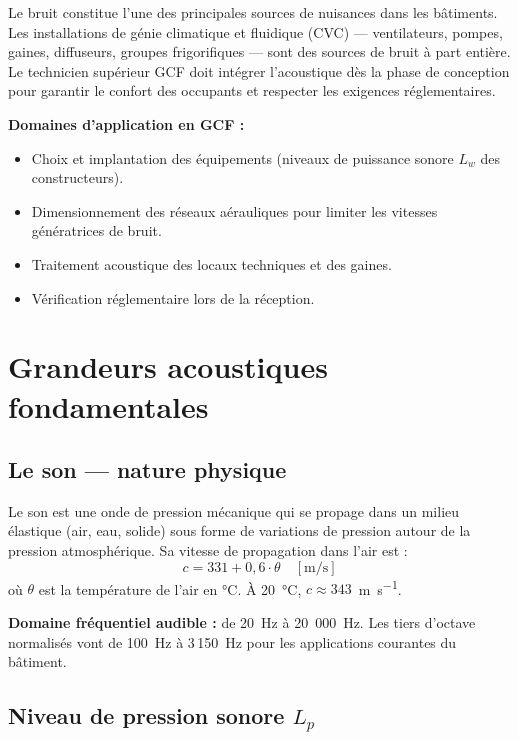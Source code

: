 Le bruit constitue l'une des principales sources de nuisances dans les bâtiments. Les installations de génie climatique et fluidique (CVC) — ventilateurs, pompes, gaines, diffuseurs, groupes frigorifiques — sont des sources de bruit à part entière. Le technicien supérieur GCF doit intégrer l'acoustique dès la phase de conception pour garantir le confort des occupants et respecter les exigences réglementaires.

\textbf{Domaines d'application en GCF :}
\begin{itemize}
  \item Choix et implantation des équipements (niveaux de puissance sonore $L_w$ des constructeurs).
  \item Dimensionnement des réseaux aérauliques pour limiter les vitesses génératrices de bruit.
  \item Traitement acoustique des locaux techniques et des gaines.
  \item Vérification réglementaire lors de la réception.
\end{itemize}

\section{Grandeurs acoustiques fondamentales}

\subsection{Le son — nature physique}

\begin{definition}
Le son est une onde de pression mécanique qui se propage dans un milieu élastique (air, eau, solide) sous forme de variations de pression autour de la pression atmosphérique. Sa vitesse de propagation dans l'air est :
\[
  c = 331 + 0{,}6 \cdot \theta \quad [\si{\metre\per\second}]
\]
où $\theta$ est la température de l'air en \si{\degreeCelsius}. À 20~\si{\degreeCelsius}, $c \approx 343$~\si{\metre\per\second}.
\end{definition}

\textbf{Domaine fréquentiel audible :} de 20~\si{\hertz} à 20~000~\si{\hertz}. Les tiers d'octave normalisés vont de 100~\si{\hertz} à 3\,150~\si{\hertz} pour les applications courantes du bâtiment.

\subsection{Niveau de pression sonore \texorpdfstring{$L_p$}{Lp}}

